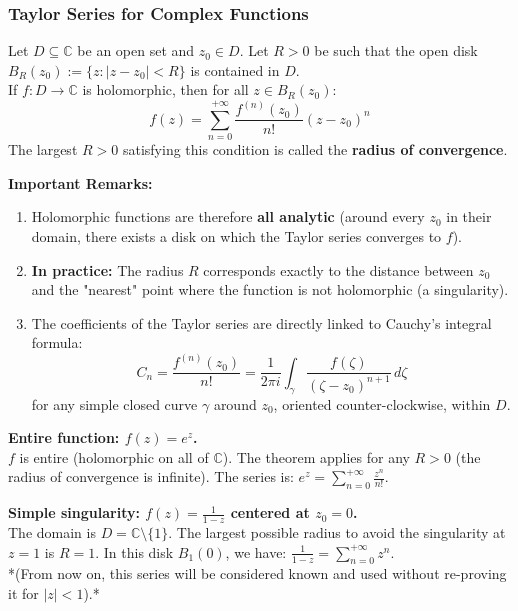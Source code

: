 \subsubsection{Taylor Series for Complex Functions}

\begin{theorem}
Let $D \subseteq \mathbb{C}$ be an open set and $z_0 \in D$. Let $R > 0$ be such that the open disk $B_R(z_0) := \{z : |z - z_0| < R\}$ is contained in $D$. \\
If $f: D \rightarrow \mathbb{C}$ is holomorphic, then for all $z \in B_R(z_0)$:
\begin{equation}
f(z) = \sum_{n=0}^{+\infty} \frac{f^{(n)}(z_0)}{n!} (z - z_0)^n
\end{equation}
The largest $R > 0$ satisfying this condition is called the \textbf{radius of convergence}.
\end{theorem}

\textbf{Important Remarks:}
\begin{enumerate}
    \item Holomorphic functions are therefore \textbf{all analytic} (around every $z_0$ in their domain, there exists a disk on which the Taylor series converges to $f$).
    \item \textbf{In practice:} The radius $R$ corresponds exactly to the distance between $z_0$ and the "nearest" point where the function is not holomorphic (a singularity).
    \item The coefficients of the Taylor series are directly linked to Cauchy's integral formula:
    $$C_n = \frac{f^{(n)}(z_0)}{n!} = \frac{1}{2\pi i} \int_{\gamma} \frac{f(\zeta)}{(\zeta - z_0)^{n+1}} \, d\zeta$$
    for any simple closed curve $\gamma$ around $z_0$, oriented counter-clockwise, within $D$.
\end{enumerate}

\begin{example}
\textbf{Entire function: $f(z) = e^z$.} \\
$f$ is entire (holomorphic on all of $\mathbb{C}$). The theorem applies for any $R > 0$ (the radius of convergence is infinite). The series is: $e^z = \sum_{n=0}^{+\infty} \frac{z^n}{n!}$.
\end{example}

\begin{example}
\textbf{Simple singularity: $f(z) = \frac{1}{1 - z}$ centered at $z_0 = 0$.} \\
The domain is $D = \mathbb{C} \setminus \{1\}$. The largest possible radius to avoid the singularity at $z=1$ is $R = 1$. In this disk $B_1(0)$, we have: $\frac{1}{1 - z} = \sum_{n=0}^{+\infty} z^n$. \\
*(From now on, this series will be considered known and used without re-proving it for $|z|<1$).*
\end{example}

